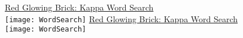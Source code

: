 \documentclass[white]{GL2020}
\begin{document}
\name{\wWordSearchKappa{}}

\vspace*{0.5cm}
\begin{center}
{\LARGE \underline{Red Glowing Brick: Kappa Word Search}}\\
\vspace{0.5cm}
\texttt{[image: WordSearch]}
\vfill
{\LARGE \underline{Red Glowing Brick: Kappa Word Search}}\\
\vspace{0.5cm}
\texttt{[image: WordSearch]}
\end{center}
\end{document}
